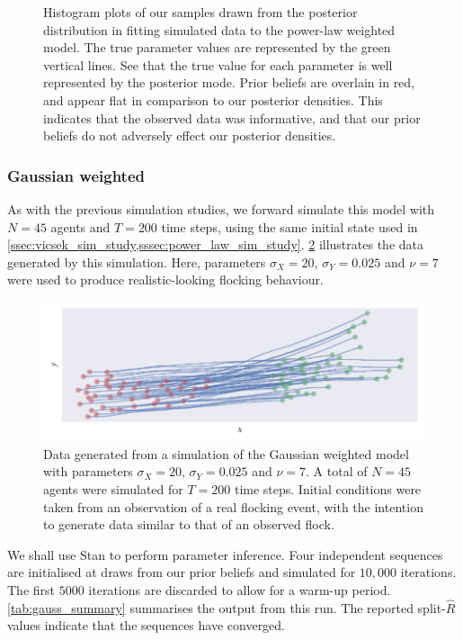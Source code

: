 \begin{figure}[tbp]
  \caption{Histogram plots of our samples drawn from the posterior distribution
    in fitting simulated data to the power-law weighted model. The true
    parameter values are represented by the green vertical lines. See that
    the true value for each parameter is well represented by the posterior
    mode. Prior beliefs are overlain in red, and appear flat in comparison to
    our posterior densities. This indicates that the observed data was
    informative, and that our prior beliefs do not adversely effect our
    posterior densities.}
  \label{fig:power_hist}
\end{figure}

\subsubsection{Gaussian weighted}

As with the previous simulation studies, we forward simulate this model with
$N=45$ agents and $T=200$ time steps, using the same initial state used in
\cref{ssec:vicsek_sim_study,sssec:power_law_sim_study}. \cref{fig:gauss_sim}
illustrates the data generated by this simulation. Here, parameters
$\sigma_X=20$, $\sigma_Y=0.025$ and $\nu=7$ were used to produce
realistic-looking flocking behaviour.

\begin{figure}[tbp]
  \includegraphics{gauss_sim.pdf}
  \caption{Data generated from a simulation of the Gaussian weighted model with
    parameters $\sigma_X=20$, $\sigma_Y=0.025$ and $\nu=7$. A total of $N=45$
    agents were simulated for $T=200$ time steps. Initial conditions
    were taken from an observation of a real flocking event, with the intention
    to generate data similar to that of an observed flock.}
  \label{fig:gauss_sim}
\end{figure}

We shall use Stan to perform parameter inference. Four independent sequences
are initialised at draws from our prior beliefs and simulated for $10,000$
iterations. The first $5000$ iterations are discarded to allow for a warm-up
period. \cref{tab:gauss_summary} summarises the output from this run. The
reported split-$\widehat{R}$ values indicate that the sequences have converged.

